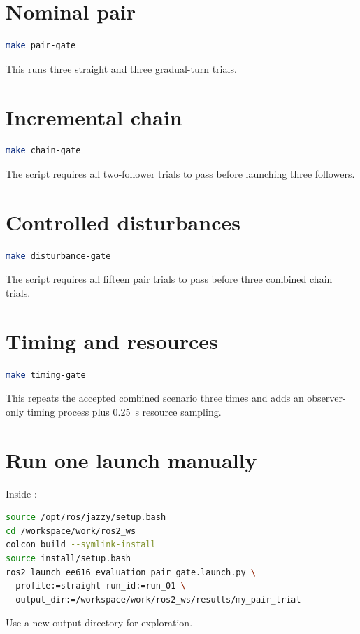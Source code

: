\documentclass[11pt,oneside,openany]{book}
\newcommand{\file}[1]{\path{#1}}
\begin{document}
\section{Nominal pair}

\begin{lstlisting}[language=bash]
make pair-gate
\end{lstlisting}
This runs three straight and three gradual-turn trials.

\section{Incremental chain}

\begin{lstlisting}[language=bash]
make chain-gate
\end{lstlisting}
The script requires all two-follower trials to pass before launching three followers.

\section{Controlled disturbances}

\begin{lstlisting}[language=bash]
make disturbance-gate
\end{lstlisting}
The script requires all fifteen pair trials to pass before three combined chain trials.

\section{Timing and resources}

\begin{lstlisting}[language=bash]
make timing-gate
\end{lstlisting}
This repeats the accepted combined scenario three times and adds an observer-only timing process plus 0.25~s resource sampling.

\section{Run one launch manually}

Inside \file{make gpu-shell}:
\begin{lstlisting}[language=bash]
source /opt/ros/jazzy/setup.bash
cd /workspace/work/ros2_ws
colcon build --symlink-install
source install/setup.bash
ros2 launch ee616_evaluation pair_gate.launch.py \
  profile:=straight run_id:=run_01 \
  output_dir:=/workspace/work/ros2_ws/results/my_pair_trial
\end{lstlisting}
Use a new output directory for exploration.
\end{document}

